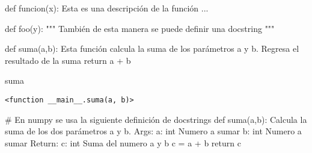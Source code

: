 \documentclass[
  letterpaper,
  DIV=11,
  numbers=noendperiod]{scrreprt}
\newenvironment{Shaded}{\begin{snugshade}}{\end{snugshade}}
\newcommand{\CommentTok}[1]{\textcolor[rgb]{0.37,0.37,0.37}{#1}}
\newcommand{\ControlFlowTok}[1]{\textcolor[rgb]{0.00,0.23,0.31}{#1}}
\newcommand{\KeywordTok}[1]{\textcolor[rgb]{0.00,0.23,0.31}{#1}}
\newcommand{\NormalTok}[1]{\textcolor[rgb]{0.00,0.23,0.31}{#1}}
\newcommand{\OperatorTok}[1]{\textcolor[rgb]{0.37,0.37,0.37}{#1}}
\begin{document}
\begin{Shaded}
\begin{Highlighting}[]
\KeywordTok{def}\NormalTok{ funcion(x):}
    \CommentTok{\textquotesingle{}\textquotesingle{}\textquotesingle{}}
\CommentTok{    Esta es una descripción de la función ...}
\CommentTok{    \textquotesingle{}\textquotesingle{}\textquotesingle{}}
    
\KeywordTok{def}\NormalTok{ foo(y):}
    \CommentTok{"""}
\CommentTok{    También de esta manera se puede definir una docstring}
\CommentTok{    """}
   
\end{Highlighting}
\end{Shaded}

\begin{Shaded}
\begin{Highlighting}[]
\KeywordTok{def}\NormalTok{ suma(a,b):}
    \CommentTok{\textquotesingle{}\textquotesingle{}\textquotesingle{}}
\CommentTok{    Esta función calcula  la suma de los parámetros a y b. }
\CommentTok{    Regresa el resultado de la suma}
\CommentTok{    \textquotesingle{}\textquotesingle{}\textquotesingle{}}
    \ControlFlowTok{return}\NormalTok{ a }\OperatorTok{+}\NormalTok{ b}
\end{Highlighting}
\end{Shaded}

\begin{Shaded}
\begin{Highlighting}[]
\NormalTok{suma}
\end{Highlighting}
\end{Shaded}

\begin{verbatim}
<function __main__.suma(a, b)>
\end{verbatim}

\begin{Shaded}
\begin{Highlighting}[]
\CommentTok{\# En numpy se usa la siguiente definición de docstrings}
\KeywordTok{def}\NormalTok{ suma(a,b):}
    \CommentTok{\textquotesingle{}\textquotesingle{}\textquotesingle{}}
\CommentTok{    Calcula la suma de los dos parámetros a y b.}
\CommentTok{    }
\CommentTok{    Args: }
\CommentTok{        a: int Numero a sumar}
\CommentTok{        b: int Numero a sumar}
\CommentTok{    Return:}
\CommentTok{        c: int Suma del numero a y b}
\CommentTok{    \textquotesingle{}\textquotesingle{}\textquotesingle{}}
\NormalTok{    c }\OperatorTok{=}\NormalTok{ a }\OperatorTok{+}\NormalTok{ b}
    \ControlFlowTok{return}\NormalTok{ c}
\end{Highlighting}
\end{Shaded}
\end{document}
